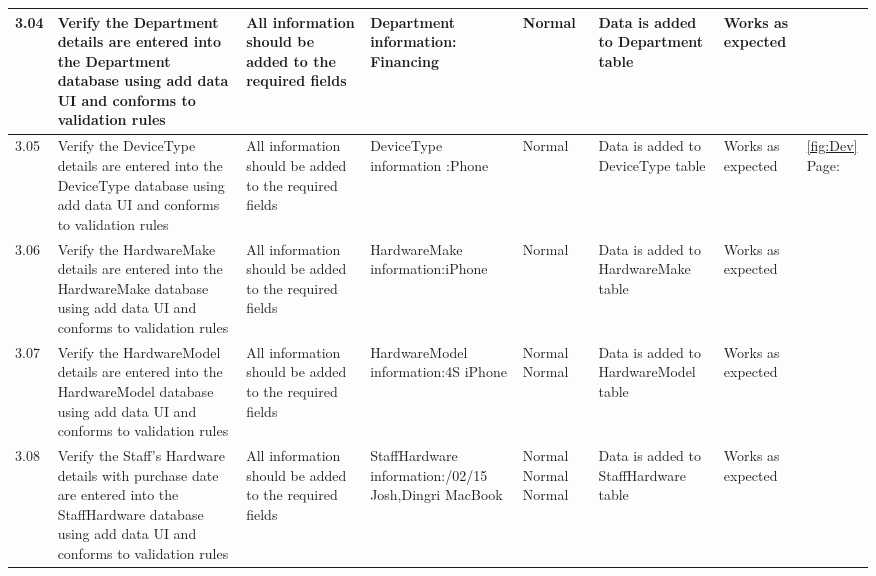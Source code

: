 \begin{landscape}
\begin{center}
\begin{longtable}{|p{1.5cm}|p{2cm}|p{2.5cm}|p{2cm}|p{2cm}|p{2cm}|p{3cm}|p{1.7cm}|}
3.04 & Verify the Department details are entered into the Department database using add data UI and conforms to validation rules & All information should be added to the required fields  &Department information: \newline Financing & \newline \newline Normal& Data is added to Department table &Works as expected& \\ \hline
3.05 & Verify the DeviceType details are entered into the DeviceType database using add data UI and conforms to validation rules & All information should be added to the required fields  &DeviceType information :\newline Phone & \newline \newline Normal& Data is added to DeviceType table &Works as expected&\ref {fig:Dev} Page: \pageref{fig:Dev}\\ \hline
3.06 & Verify the HardwareMake details are entered into the HardwareMake database using add data UI and conforms to validation rules & All information should be added to the required fields  &HardwareMake information:\newline iPhone & \newline \newline Normal& Data is added to HardwareMake table &Works as expected& \\ \hline
3.07 & Verify the HardwareModel details are entered into the HardwareModel database using add data UI and conforms to validation rules & All information should be added to the required fields  &HardwareModel information:\newline 4S \newline iPhone& \newline \newline Normal \newline Normal& Data is added to HardwareModel table &Works as expected& \\ \hline
3.08 & Verify the Staff's Hardware details with purchase date are entered into the StaffHardware database using add data UI and conforms to validation rules & All information should be added to the required fields  &StaffHardware information:\newline 21/02/15 \newline Josh,Dingri \newline MacBook& \newline \newline Normal \newline Normal \newline Normal& Data is added to StaffHardware table &Works as expected& \\ \hline

\end{longtable}
\end{center}
\end{landscape}
